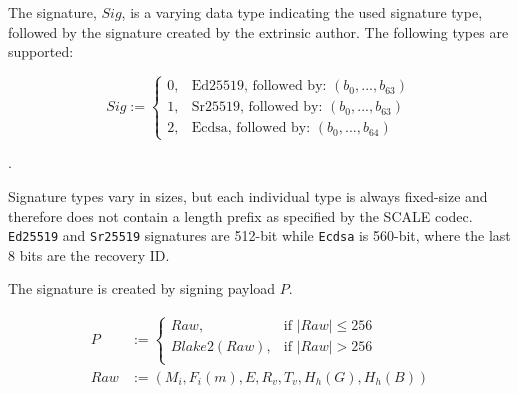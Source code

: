 \begin{definition}
    \label{defn-extrinsic-signature}
    The signature, $Sig$, is a varying data type indicating the used signature
    type, followed by the signature created by the extrinsic author. The
    following types are supported:

    \[
        Sig :=
        \begin{cases}
        0, & \text{Ed25519, followed by: } (b_0, ...,b_{63}) \\
        1, & \text{Sr25519, followed by: } (b_0, ...,b_{63}) \\
        2, & \text{Ecdsa, followed by: } (b_0, ...,b_{64})
        \end{cases}
    \]

    .
    \newline

    Signature types vary in sizes, but each individual type is always fixed-size
    and therefore does not contain a length prefix as specified by the SCALE
    codec. \verb|Ed25519| and \verb|Sr25519| signatures are 512-bit while
    \verb|Ecdsa| is 560-bit, where the last 8 bits are the recovery ID.
    \newline

    The signature is created by signing payload $P$.

    \begin{equation}
        \begin{aligned}
        P &:= \begin{cases}
            Raw, & \text{if } |Raw| \leq 256\\
            Blake2(Raw), & \text{if } |Raw| > 256\\
        \end{cases}\\
        Raw &:= (M_i, F_i(m), E, R_v, T_v, H_h(G), H_h(B))\\
        \end{aligned}
    \end{equation}


\end{definition}
